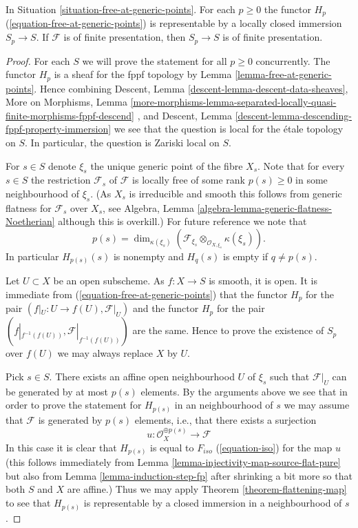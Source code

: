 \begin{lemma}
\label{lemma-free-at-generic-points-representable}
In Situation \ref{situation-free-at-generic-points}.
For each $p \geq 0$ the functor $H_p$
(\ref{equation-free-at-generic-points}) is representable
by a locally closed immersion $S_p \to S$. If $\mathcal{F}$
is of finite presentation, then $S_p \to S$ is of finite presentation.
\end{lemma}

\begin{proof}
For each $S$ we will prove the statement for all $p \geq 0$ concurrently.
The functor $H_p$ is a sheaf for the fppf topology by
Lemma \ref{lemma-free-at-generic-points}.
Hence combining
Descent, Lemma \ref{descent-lemma-descent-data-sheaves},
More on Morphisms, Lemma
\ref{more-morphisms-lemma-separated-locally-quasi-finite-morphisms-fppf-descend}
, and
Descent, Lemma \ref{descent-lemma-descending-fppf-property-immersion}
we see that the question is local for the \'etale topology on $S$.
In particular, the question is Zariski local on $S$.

\medskip\noindent
For $s \in S$ denote $\xi_s$ the unique generic point of the fibre $X_s$.
Note that for every $s \in S$ the restriction $\mathcal{F}_s$ of
$\mathcal{F}$ is locally free of some rank $p(s) \geq 0$ in some
neighbourhood of $\xi_s$. (As $X_s$ is irreducible
and smooth this follows from generic flatness for $\mathcal{F}_s$ over
$X_s$, see
Algebra, Lemma \ref{algebra-lemma-generic-flatness-Noetherian}
although this is overkill.) For future reference we note that
$$
p(s) =
\dim_{\kappa(\xi_s)}(
\mathcal{F}_{\xi_s} \otimes_{\mathcal{O}_{X, \xi_s}} \kappa(\xi_s)
).
$$
In particular $H_{p(s)}(s)$ is nonempty and $H_q(s)$ is empty
if $q \not = p(s)$.

\medskip\noindent
Let $U \subset X$ be an open subscheme.
As $f : X \to S$ is smooth, it is open.
It is immediate from (\ref{equation-free-at-generic-points})
that the functor $H_p$ for the pair $(f|_U : U \to f(U), \mathcal{F}|_U)$
and the functor $H_p$ for the pair
$(f|_{f^{-1}(f(U))}, \mathcal{F}|_{f^{-1}(f(U))})$
are the same. Hence to prove the existence of $S_p$ over $f(U)$ we may
always replace $X$ by $U$.

\medskip\noindent
Pick $s \in S$. There exists an affine open neighbourhood $U$
of $\xi_s$ such that $\mathcal{F}|_U$ can be generated by at most
$p(s)$ elements. By the arguments above we see that in order to prove
the statement for $H_{p(s)}$ in an neighbourhood of $s$ we may assume
that $\mathcal{F}$ is generated by $p(s)$ elements, i.e., that there exists
a surjection
$$
u : \mathcal{O}_X^{\oplus p(s)} \longrightarrow \mathcal{F}
$$
In this case it is clear that $H_{p(s)}$ is equal to $F_{iso}$
(\ref{equation-iso}) for the map $u$ (this follows immediately from
Lemma \ref{lemma-injectivity-map-source-flat-pure}
but also from
Lemma \ref{lemma-induction-step-fp}
after shrinking a bit more so that both $S$ and $X$ are affine.)
Thus we may apply
Theorem \ref{theorem-flattening-map}
to see that $H_{p(s)}$ is representable by a closed immersion in a
neighbourhood of $s$.


\end{proof}
